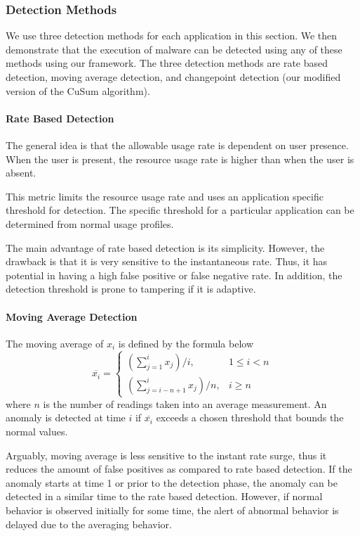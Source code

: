 \subsubsection{Detection Methods}

We use three detection methods for each application in this section.  We then
demonstrate that the execution of malware can be detected using any of these
methods using our framework.  The three detection methods are rate based
detection, moving average detection, and changepoint detection (our modified
version of the CuSum algorithm).

\paragraph{Rate Based Detection}

The general idea is that the allowable usage rate is dependent on user presence.
When the user is present, the resource usage rate is higher than 
when the user is absent.

This metric limits the resource usage rate 
and uses an application specific threshold for detection.
The specific threshold for a particular application 
can be determined from normal usage profiles.

The main advantage of rate based detection is its simplicity. 
However, the drawback is that it is very sensitive to the instantaneous rate. 
Thus, it has potential in having a high false positive or false negative rate. 
In addition, the detection threshold is prone to tampering if it is adaptive.

\paragraph{Moving Average Detection}

The moving average of $x_i$ is defined by the formula below
\begin{equation}\label{movAvg}
    \overline{x_i} = \left\{ \begin{array}{lr}
        (\sum_{j=1}^{i}{x_j})/i, & 1 \leq i < n \\
        (\sum_{j=i-n+1}^{i}{x_j})/n, & i \geq n
    \end{array} \right.
\end{equation}
where $n$ is the number of readings taken into an average measurement. An
anomaly is detected at time $i$ if $\overline{x_i}$ exceeds a chosen threshold
that bounds the normal values.

Arguably, moving average is less sensitive to the instant rate surge, thus it
reduces the amount of false positives as compared to rate based detection. If
the anomaly starts at time 1 or prior to the detection phase, the anomaly can
be detected in a similar time to the rate based detection. However, if normal
behavior is observed initially for some time, the alert of abnormal behavior is
delayed due to the averaging behavior.


